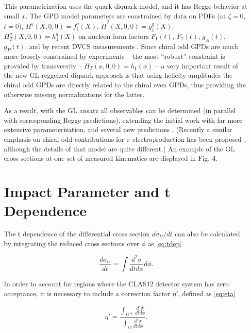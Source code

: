     This parametrization uses the quark-diquark model, and it has Regge behavior at small $x$. The GPD model parameters are constrained by data on PDFs (at $\zeta = 0$, $t = 0$), $H^q (X, 0, 0) = f^q_1 (X)$, $\tilde{H}^q (X, 0, 0) = g^q_1 (X)$, $H^q_T (X, 0, 0) = h^q_1 (X)$ on nucleon form factors $F_1(t)$, $F_2(t)$, $g_A(t)$, $g_P (t)$, and by recent DVCS measurements \parencite{2} \parencite{3}. Since chiral odd GPDs are much more loosely constrained by experiments – the most “robust” constraint is provided by transversity – $H_T (x, 0, 0) = h_1(x)$ – a very important result of the new GL reggeized diquark approach \parencite{10} is that using helicity amplitudes the chiral odd GPDs are directly related to the chiral even GPDs, thus providing the otherwise missing normalizations for the latter.
    
    As a result, with the GL ansatz all observables can be determined (in parallel with corresponding Regge predictions), extending the initial work \parencite{9} with far more extensive parameterization, and several new predictions \parencite{11, 10}. (Recently a similar emphasis on chiral odd contributions for $\pi$ electroproduction has been proposed \parencite{5}, although the details of that model are quite different.) An example of the GL cross sections at one set of measured kinematics are displayed in Fig. 4.
    \fi



\clearpage
\section{Impact Parameter and t Dependence}
    
    The t dependence of the differential cross section $d\sigma_U/dt$ can also be calculated by integrating the reduced cross sections over $\phi$ as \eqref{eq:tdep}
    
     \begin{equation}\label{eq:tdep}
        \frac{d\sigma_U}{dt} = \int \frac{d^2\sigma}{dtd\phi} d\phi.
    \end{equation}
    
    In order to account for regions where the CLAS12 detector system has zero acceptance, it is necessary to include a correction factor $\eta'$, defined as \eqref{eq:eta}
    
     \begin{equation}\label{eq:eta}
        \eta' = \frac{\int_{\Omega*} \frac{d^2\sigma}{dtd\phi} }{\int_{\Omega} \frac{d^2\sigma}{dtd\phi}}.
    \end{equation}

